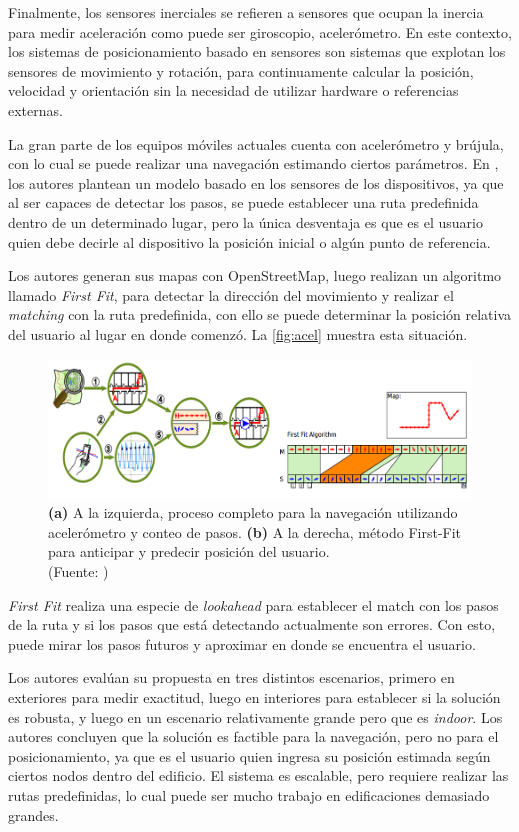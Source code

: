 Finalmente, los sensores inerciales se refieren a sensores que ocupan la inercia para medir aceleración como puede ser giroscopio, acelerómetro. En este contexto, los sistemas de posicionamiento basado en sensores son sistemas que explotan los sensores de movimiento y rotación, para continuamente calcular la posición, velocidad y orientación sin la necesidad de utilizar hardware o referencias externas.

La gran parte de los equipos móviles actuales cuenta con acelerómetro y brújula, con lo cual se puede realizar una navegación estimando ciertos parámetros. En \citep{6071934, 5766963} , los autores plantean un modelo basado en los sensores de los dispositivos, ya que al ser capaces de detectar los pasos, se puede establecer una ruta predefinida dentro de un determinado lugar, pero la única desventaja es que es el usuario quien debe decirle al dispositivo la posición inicial o algún punto de referencia.

Los autores generan sus mapas con OpenStreetMap, luego realizan un algoritmo llamado \textit{First Fit}, para detectar la dirección del movimiento y realizar el \textit{matching} con la ruta predefinida, con ello se puede determinar la posición relativa del usuario al lugar en donde comenzó. La \autoref{fig:acel} muestra esta situación.

\begin{figure}[ht!]
\centering
\includegraphics[width=.6\textwidth]{figures/acel.png}
\caption[Navegación mediante sensores inerciales \textit{First Fit} ]{\textbf{(a)} A la izquierda, proceso completo para la navegación utilizando acelerómetro y conteo de pasos. \textbf{(b)} A la derecha, método First-Fit para anticipar y predecir posición del usuario.\\
{\scriptsize (Fuente: \citep{6071934, 5766963})}}
\label{fig:acel}
\end{figure}

\textit{First Fit} realiza una especie de \textit{lookahead} para establecer el match con los pasos de la ruta y si los pasos que está detectando actualmente son errores. Con esto, puede mirar los pasos futuros y aproximar en donde se encuentra el usuario.

Los autores evalúan su propuesta en tres distintos escenarios, primero en exteriores para medir exactitud, luego en interiores para establecer si la solución es robusta, y luego en un escenario relativamente grande pero que es \textit{indoor}. Los autores concluyen que la solución es factible para la navegación, pero no para el posicionamiento, ya que es el usuario quien ingresa su posición estimada según ciertos nodos dentro del edificio. El sistema es escalable, pero requiere realizar las rutas predefinidas, lo cual puede ser mucho trabajo en edificaciones demasiado grandes.

